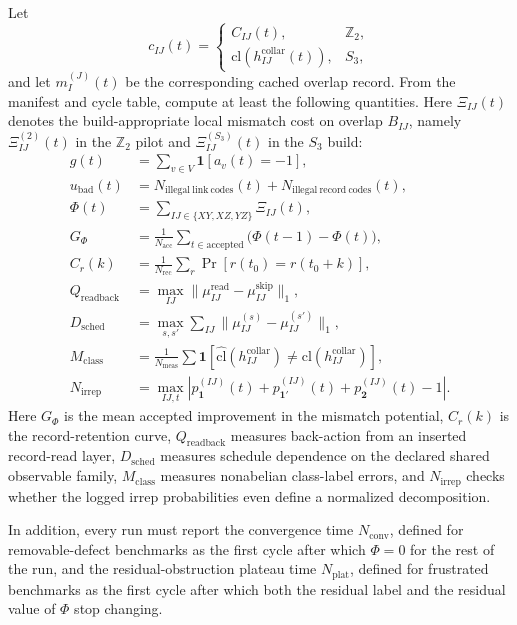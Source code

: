 \documentclass[11pt]{article}
\begin{document}
Let
\begin{equation}
c_{IJ}(t)=
\begin{cases}
C_{IJ}(t), & \mathbb Z_2,\\
\mathrm{cl}(h_{IJ}^{\mathrm{collar}}(t)), & S_3,
\end{cases}
\end{equation}
and let $m_I^{(J)}(t)$ be the corresponding cached overlap record. From the manifest and cycle
table, compute at least the following quantities. Here $\Xi_{IJ}(t)$ denotes the
build-appropriate local mismatch cost on overlap $B_{IJ}$, namely
$\Xi_{IJ}^{(2)}(t)$ in the $\mathbb Z_2$ pilot and $\Xi_{IJ}^{(S_3)}(t)$ in the
$S_3$ build:
\begin{align}
g(t) &= \sum_{v\in V}\mathbf 1[a_v(t)=-1],\\
u_{\mathrm{bad}}(t) &= N_{\mathrm{illegal\ link\ codes}}(t)+N_{\mathrm{illegal\ record\ codes}}(t),\\
\Phi(t) &= \sum_{IJ\in\{XY,XZ,YZ\}}\Xi_{IJ}(t),\\
G_{\Phi} &= \frac{1}{N_{\mathrm{acc}}}\sum_{t\in \mathrm{accepted}}\bigl(\Phi(t-1)-\Phi(t)\bigr),\\
C_r(k) &= \frac{1}{N_{\mathrm{rec}}}\sum_r \Pr[r(t_0)=r(t_0+k)],\\
Q_{\mathrm{readback}} &= \max_{IJ}\|\mu_{IJ}^{\mathrm{read}}-\mu_{IJ}^{\mathrm{skip}}\|_1,\\
D_{\mathrm{sched}} &= \max_{s,s'}\sum_{IJ}\|\mu_{IJ}^{(s)}-\mu_{IJ}^{(s')}\|_1,\\
M_{\mathrm{class}} &= \frac{1}{N_{\mathrm{meas}}}\sum \mathbf 1[\widehat{\mathrm{cl}}(h_{IJ}^{\mathrm{collar}})\neq \mathrm{cl}(h_{IJ}^{\mathrm{collar}})],\\
N_{\mathrm{irrep}} &= \max_{IJ,t}\left|p_{\mathbf 1}^{(IJ)}(t)+p_{\mathbf 1'}^{(IJ)}(t)+p_{\mathbf 2}^{(IJ)}(t)-1\right|.
\end{align}
Here $G_{\Phi}$ is the mean accepted improvement in the mismatch potential, $C_r(k)$ is the
record-retention curve, $Q_{\mathrm{readback}}$ measures back-action from an inserted record-read
layer, $D_{\mathrm{sched}}$ measures schedule dependence on the declared shared observable
family, $M_{\mathrm{class}}$ measures nonabelian class-label errors, and $N_{\mathrm{irrep}}$
checks whether the logged irrep probabilities even define a normalized decomposition.

In addition, every run must report the convergence time $N_{\mathrm{conv}}$, defined for
removable-defect benchmarks as the first cycle after which $\Phi=0$ for the rest of the run, and
the residual-obstruction plateau time $N_{\mathrm{plat}}$, defined for frustrated benchmarks as
the first cycle after which both the residual label and the residual value of $\Phi$ stop
changing.
\end{document}

